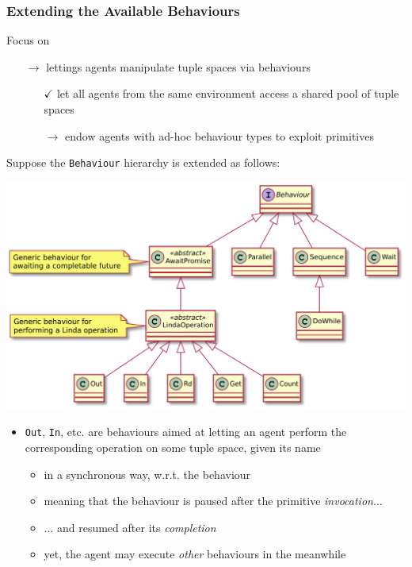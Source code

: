 \documentclass[presentation]{beamer}\mode<presentation>{\usetheme{AMSCesenaPurpleAndGold}}
\begin{document}
\begin{frame}[allowframebreaks]
	\frametitle{Extending the Available Behaviours}
	
	\begin{alertblock}{Focus on}
		\begin{itemize}
			\item[$\rightarrow$] lettings agents manipulate tuple spaces \alert{via behaviours}
			\begin{itemize}
				\item[$\checkmark$] let all agents from the same environment access a \alert{shared} pool of tuple spaces
				\item[$\rightarrow$] endow agents with ad-hoc behaviour types to exploit \linda{} primitives
			\end{itemize}
		\end{itemize}
	\end{alertblock}
	
	\framebreak
	
	Suppose the \texttt{Behaviour} hierarchy is extended as follows:
	\begin{center}
		\includegraphics[width=.8\linewidth]{./img/classes-overview.pdf}
	\end{center}

	\framebreak
	
	\begin{itemize}
		\item \texttt{Out}, \texttt{In}, etc. are \alert{behaviours} aimed at letting an agent perform the corresponding \linda{} operation on some tuple space, given its name
		\begin{itemize}
			\item in a \alert{synchronous} way, w.r.t. the behaviour
			\item meaning that the behaviour is \alert{paused} after the primitive \emph{invocation}$\ldots$
			\item $\ldots$ and resumed after its \emph{completion}
			\item yet, the agent may execute \emph{other} behaviours in the meanwhile
		\end{itemize}
		

\end{itemize}
\end{frame}
\end{document}
